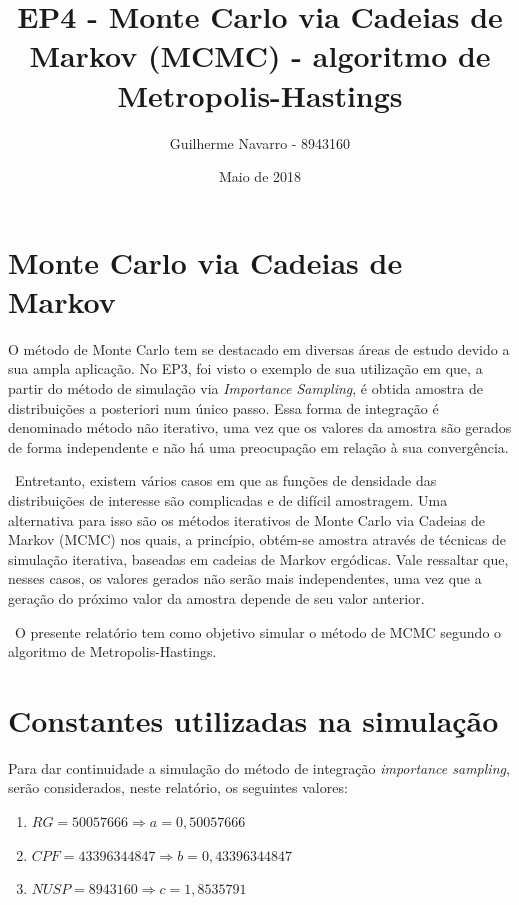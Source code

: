 \documentclass{article} %
\begin{document}

\title{EP4 - Monte Carlo via Cadeias de Markov (MCMC) - algoritmo de Metropolis-Hastings} %
\author{Guilherme Navarro - 8943160} %
\date{Maio de 2018} %

\maketitle

\section{Monte Carlo via Cadeias de Markov}

\qquad O método de Monte Carlo tem se destacado em diversas áreas de estudo devido a sua ampla aplicação. No EP3, foi visto o exemplo de sua utilização em que, a partir do método de simulação via {\it{Importance Sampling}}, é obtida amostra de distribuições a posteriori num único passo. Essa forma de integração é denominado método não iterativo, uma vez que os valores da amostra são gerados de forma independente e não há uma preocupação em relação à sua convergência. 

\ Entretanto, existem vários casos em que as funções de densidade das distribuições de interesse são complicadas e de difícil amostragem. Uma alternativa para isso são os métodos iterativos de Monte Carlo via Cadeias de Markov (MCMC) nos quais, a princípio, obtém-se amostra através de técnicas de simulação iterativa, baseadas em cadeias de Markov ergódicas. Vale ressaltar que, nesses casos, os valores gerados não serão mais independentes, uma vez que a geração do próximo valor da amostra depende de seu valor anterior.

\ O presente relatório tem como objetivo simular o método de MCMC segundo o algoritmo de Metropolis-Hastings.

\section{Constantes utilizadas na simulação}

\qquad Para dar continuidade a simulação do método de integração {\it {importance sampling}}, serão considerados, neste relatório, os seguintes valores: 

\begin{enumerate}
\item $RG = 50057666 \Rightarrow a = 0,50057666$
\item $CPF = 43396344847 \Rightarrow b = 0,43396344847$
\item $NUSP = 8943160 \Rightarrow c = 1,8535791$ 

\end{enumerate}
\end{document}
